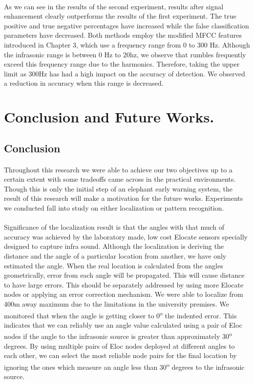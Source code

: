 \documentclass[12pt]{article}
\numberwithin{figure}{section}
\numberwithin{table}{section}
\begin{document}
\paragraph{}
As we can see in the results of the second experiment, results after signal enhancement clearly outperforms the results of the first experiment. The true positive and true negative percentages have increased while the false classification parameters have decreased. Both methods employ the modified MFCC features introduced in Chapter 3, which use a frequency range from 0 to 300 Hz. Although the infrasonic range is between 0 Hz to 20hz, we observe that rumbles frequently exceed this frequency range due to the harmonics. Therefore, taking the upper limit as 300Hz has had a high impact on the accuracy of detection. We observed a reduction in accuracy when this range is decreased. 


\newpage
\section{Conclusion and Future Works.}
\subsection{Conclusion}
\paragraph{}
Throughout this research we were able to achieve our two objectives up to a certain extent with some tradeoffs came across in the practical environments. Though this is only the initial step of an elephant early warning system, the result of this research will make a motivation for the future works. Experiments we conducted fall into study on either localization or pattern recognition.

\paragraph{}
Significance of the localization result is that the angles with that much of accuracy was achieved by the laboratory made, low cost Elocate sensors specially designed to capture infra sound. Although the localization is deriving the distance and the angle of a particular location from another, we have only estimated the angle. When the real location is calculated from the angles geometrically, error from each angle will be propagated. This will cause distance to have large errors. This should be separately addressed by using more Elocate nodes or applying an error correction mechanism. 
We were able to localize from 400m away maximum due to the limitations in the university premises. We monitored that when the angle is getting closer to 0\textsuperscript{o} the indented error. This indicates that we can reliably use an angle value calculated using a pair of Eloc nodes if the angle to the infrasonic source is greater than approximately 30\textsuperscript{o} degrees. By using multiple pairs of Eloc nodes deployed at different angles to each other, we can select the most reliable node pairs for the final location by ignoring the ones which measure an angle less than 30\textsuperscript{o} degrees to the infrasonic source. 
\end{document}
